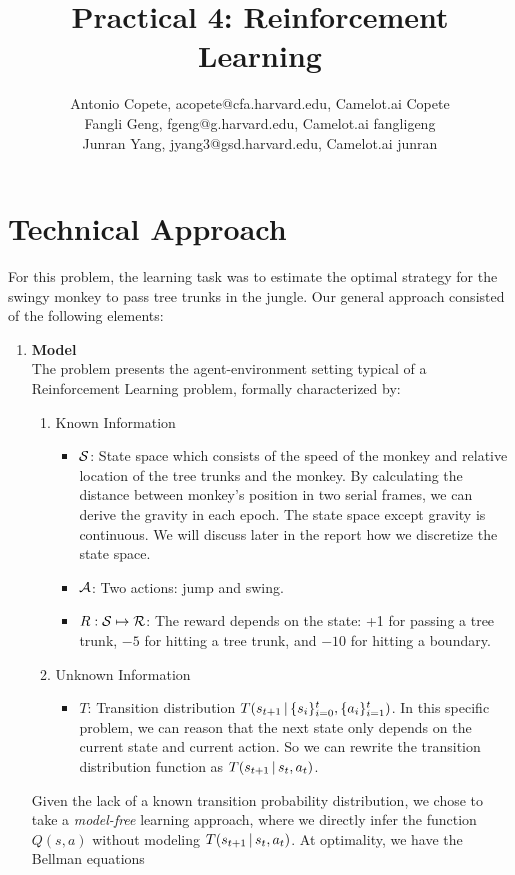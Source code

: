 \documentclass[11pt]{article}
\title{Practical 4: Reinforcement Learning}
\author{Antonio Copete, acopete@cfa.harvard.edu, Camelot.ai Copete\\
Fangli Geng, fgeng@g.harvard.edu, Camelot.ai fangligeng\\
Junran Yang, jyang3@gsd.harvard.edu, Camelot.ai junran}
\begin{document}
\maketitle{}

\section{Technical Approach}
For this problem, the learning task was to estimate the optimal strategy for the swingy monkey to pass tree trunks in the jungle. Our general approach consisted of the following elements:

      \begin{enumerate}
        \item \textbf{Model}\\
          \noindent The problem presents the agent-environment setting typical of a Reinforcement Learning problem, formally characterized by:
          \begin{enumerate}
            \item Known Information
              \begin{itemize}
                \item $\mathcal{S}$: State space which consists of the speed of the monkey and relative location of the tree trunks and the monkey. By calculating the distance between monkey's position in two serial frames, we can derive the gravity in each epoch. The state space except gravity is continuous. We will discuss later in the report how we discretize the state space.
                \item $\mathcal{A}$: Two actions: jump and swing.
                \item $R: \mathcal{S} \mapsto \mathcal{R}$: The reward depends on the state: +1 for passing a tree trunk, $-5$ for hitting a tree trunk, and $-10$ for hitting a boundary.
              \end{itemize}
            \item Unknown Information
              \begin{itemize}
              \item $T$: Transition distribution $T(s_{t+1} \,|\, \{s_i\}_{i=0}^t, \{a_i\}_{i=1}^t)$. In this specific problem, we can reason that the next state only depends on the current state and current action. So we can rewrite the transition distribution function as $T(s_{t+1} \,|\, s_t, a_t)$.
              \end{itemize}
          \end{enumerate}
          Given the lack of a known transition probability distribution, we chose to take a \emph{model-free} learning approach, where we directly infer the function $Q(s,a)$ without modeling $T(s_{t+1} \,|\, s_t, a_t)$. At optimality, we have the Bellman equations

\end{enumerate}
\end{document}
